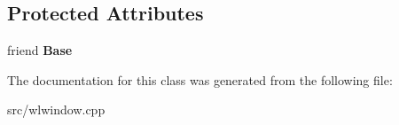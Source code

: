 \subsection*{Protected Attributes}
\begin{DoxyCompactItemize}
\item 
\mbox{\label{classSeat_ac83662b93d387b744d47e5d5ccb7ded1}} 
friend {\bfseries Base}
\end{DoxyCompactItemize}


The documentation for this class was generated from the following file\+:\begin{DoxyCompactItemize}
\item 
src/wlwindow.\+cpp\end{DoxyCompactItemize}
